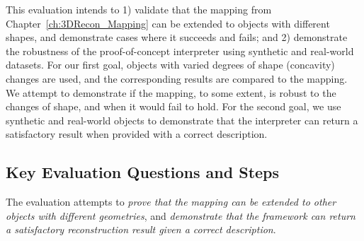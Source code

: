 This evaluation intends to 1) validate that the mapping from Chapter~\ref{ch:3DRecon_Mapping} can be extended to objects with different shapes, and demonstrate cases where it succeeds and fails; and 2) demonstrate the robustness of the proof-of-concept interpreter using synthetic and real-world datasets. For our first goal, objects with varied degrees of shape (concavity) changes are used, and the corresponding results are compared to the mapping. We attempt to demonstrate if the mapping, to some extent, is robust to the changes of shape, and when it would fail to hold. For the second goal, we use synthetic and real-world objects to demonstrate that the interpreter can return a satisfactory result when provided with a correct description.



\subsection{Key Evaluation Questions and Steps}

The evaluation attempts to \textit{prove that the mapping can be extended to other objects with different geometries}, and \textit{demonstrate that the framework can return a satisfactory reconstruction result given a correct description}.

